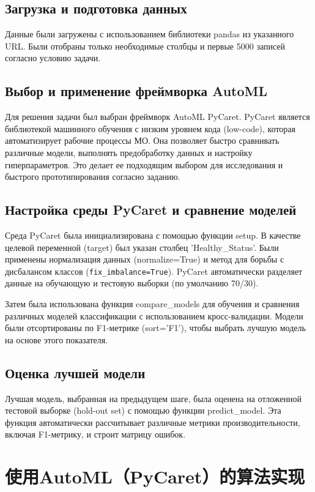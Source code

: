 \documentclass{article}
\providecommand{\pcsync}{\par\vspace{\baselineskip}}
\begin{document}
\begin{paracol}{2}
\subsection{Загрузка и подготовка данных}\label{subsec2}
\pcsync
Данные были загружены с использованием библиотеки pandas из указанного URL. Были отобраны только необходимые столбцы и первые 5000 записей согласно условию задачи.


\subsection{Выбор и применение фреймворка AutoML }\label{subsec3}
\pcsync
Для решения задачи был выбран фреймворк AutoML PyCaret. PyCaret является библиотекой машинного обучения с низким уровнем кода (low-code), которая автоматизирует рабочие процессы МО. Она позволяет быстро сравнивать различные модели, выполнять предобработку данных и настройку гиперпараметров. Это делает ее подходящим выбором для исследования и быстрого прототипирования согласно заданию.


\subsection{Настройка среды PyCaret и сравнение моделей }\label{subsec4}
\pcsync
Среда PyCaret была инициализирована с помощью функции setup. В качестве целевой переменной (target) был указан столбец 'Healthy\_Status'. Были применены нормализация данных (normalize=True) и метод для борьбы с дисбалансом классов (\texttt{fix\_imbalance=True}). PyCaret автоматически разделяет данные на обучающую и тестовую выборки (по умолчанию 70/30).

Затем была использована функция compare_models для обучения и сравнения различных моделей классификации с использованием кросс-валидации. Модели были отсортированы по F1-метрике (sort='F1'), чтобы выбрать лучшую модель на основе этого показателя.


\subsection{Оценка лучшей модели}\label{subsec5}
\pcsync
Лучшая модель, выбранная на предыдущем шаге, была оценена на отложенной тестовой выборке (hold-out set) с помощью функции predict_model. Эта функция автоматически рассчитывает различные метрики производительности, включая F1-метрику, и строит матрицу ошибок.
\switchcolumn

\section{使用AutoML（PyCaret）的算法实现}

\end{paracol}
\end{document}
